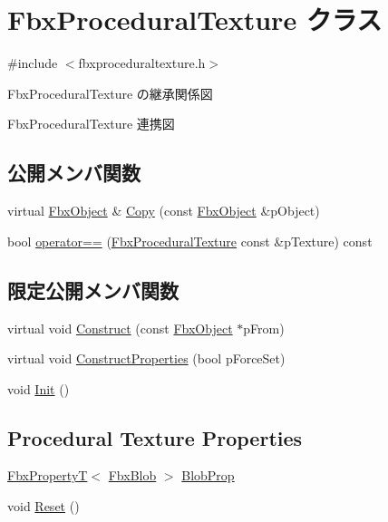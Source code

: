 \hypertarget{class_fbx_procedural_texture}{}\section{Fbx\+Procedural\+Texture クラス}
\label{class_fbx_procedural_texture}


{\ttfamily \#include $<$fbxproceduraltexture.\+h$>$}



Fbx\+Procedural\+Texture の継承関係図


Fbx\+Procedural\+Texture 連携図
\subsection*{公開メンバ関数}
\begin{DoxyCompactItemize}
\item 
virtual \hyperlink{class_fbx_object}{Fbx\+Object} \& \hyperlink{class_fbx_procedural_texture_aab5e11d2e578c958cbe97f999379eeb4}{Copy} (const \hyperlink{class_fbx_object}{Fbx\+Object} \&p\+Object)
\item 
bool \hyperlink{class_fbx_procedural_texture_a0687270beaf7354bec0e230bd85a61b7}{operator==} (\hyperlink{class_fbx_procedural_texture}{Fbx\+Procedural\+Texture} const \&p\+Texture) const
\end{DoxyCompactItemize}
\subsection*{限定公開メンバ関数}
\begin{DoxyCompactItemize}
\item 
virtual void \hyperlink{class_fbx_procedural_texture_a2386483aef2766c16c911e6fd6539d32}{Construct} (const \hyperlink{class_fbx_object}{Fbx\+Object} $\ast$p\+From)
\item 
virtual void \hyperlink{class_fbx_procedural_texture_ae718dfc2092f735a1b6bcd724029a36c}{Construct\+Properties} (bool p\+Force\+Set)
\item 
void \hyperlink{class_fbx_procedural_texture_aea1c75e2dcb3caea85e9a231c9e94a75}{Init} ()
\end{DoxyCompactItemize}
\subsection*{Procedural Texture Properties}
\begin{DoxyCompactItemize}
\item 
\hyperlink{class_fbx_property_t}{Fbx\+PropertyT}$<$ \hyperlink{class_fbx_blob}{Fbx\+Blob} $>$ \hyperlink{class_fbx_procedural_texture_aaf3a45d4b05897639d7c6a8e9d8a1b69}{Blob\+Prop}
\item 
void \hyperlink{class_fbx_procedural_texture_ad98e91a632bfbd9f29ee537cbe4ff180}{Reset} ()
\end{DoxyCompactItemize}
